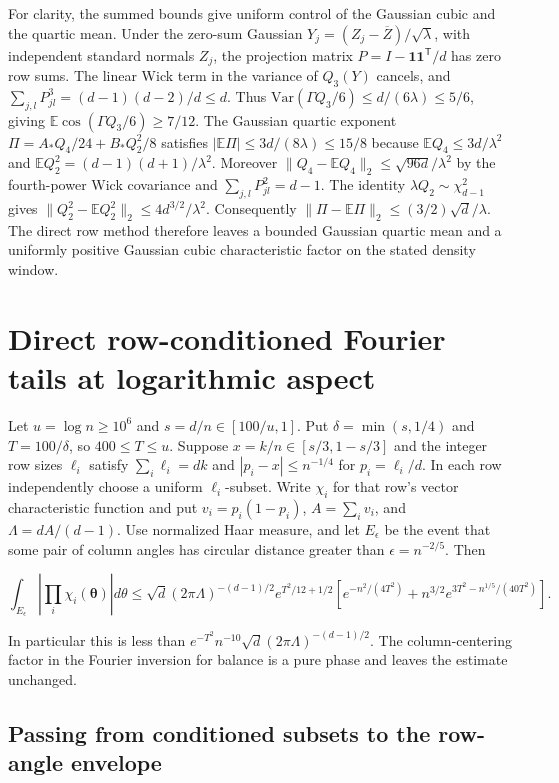 \documentclass[11pt]{article}
\begin{document}
For clarity, the summed bounds give uniform control of the Gaussian
cubic and the quartic mean. Under the zero-sum Gaussian
$Y_j=(Z_j-\overline Z)/\sqrt\lambda$, with independent standard
normals $Z_j$, the projection matrix
$P=I-\mathbf1\mathbf1^{\mathsf T}/d$ has zero row sums. The linear Wick
term in the variance of $Q_3(Y)$ cancels, and
$\sum_{j,l}P_{jl}^3=(d-1)(d-2)/d\le d$. Thus
$\mathrm{Var}(\Gamma Q_3/6)\le d/(6\lambda)\le5/6$, giving
$\mathbb E\cos(\Gamma Q_3/6)\ge7/12$.
The Gaussian quartic exponent
$\Pi=A_{\ast}Q_4/24+B_{\ast}Q_2^2/8$ satisfies
$|\mathbb E\Pi|\le3d/(8\lambda)\le15/8$ because
$\mathbb E Q_4\le3d/\lambda^2$ and
$\mathbb E Q_2^2=(d-1)(d+1)/\lambda^2$.
Moreover
$\|Q_4-\mathbb E Q_4\|_2\le\sqrt{96d}/\lambda^2$ by the fourth-power
Wick covariance and $\sum_{j,l}P_{jl}^2=d-1$.
The identity $\lambda Q_2\sim\chi^2_{d-1}$ gives
$\|Q_2^2-\mathbb E Q_2^2\|_2\le4d^{3/2}/\lambda^2$.
Consequently $\|\Pi-\mathbb E\Pi\|_2\le (3/2)\sqrt d/\lambda$.
The direct row method therefore leaves a bounded Gaussian quartic
mean and a uniformly positive Gaussian cubic characteristic factor
on the stated density window.

\section{Direct row-conditioned Fourier tails at logarithmic aspect}

Let $u=\log n\ge10^6$ and $s=d/n\in[100/u,1]$. Put $\delta=\min(s,1/4)$ and $T=100/\delta$, so $400\le T\le u$.
Suppose $x=k/n\in[s/3,1-s/3]$ and the integer row sizes $\ell_i$
satisfy $\sum_i\ell_i=dk$ and $|p_i-x|\le n^{-1/4}$ for $p_i=\ell_i/d$.
In each row independently choose a uniform $\ell_i$-subset. Write
$\chi_i$ for that row's vector characteristic function and put
$v_i=p_i(1-p_i)$, $A=\sum_i v_i$, and $\Lambda=dA/(d-1)$.
Use normalized Haar measure, and let $E_\epsilon$ be the event that
some pair of column angles has circular distance greater than
$\epsilon=n^{-2/5}$. Then

\[
\int_{E_\epsilon}\left|\prod_i\chi_i(\boldsymbol\theta)\right|d\theta
\le \sqrt d(2\pi\Lambda)^{-(d-1)/2} e^{T^2/12+1/2}
\left[
e^{-n^2/(4T^2)}
+n^{3/2}e^{3T^2-n^{1/5}/(40T^2)}
\right].
\]

In particular this is less than
$e^{-T^2}n^{-10}\sqrt d(2\pi\Lambda)^{-(d-1)/2}$.
The column-centering factor in the Fourier inversion for balance
is a pure phase and leaves the estimate unchanged.

\subsection{Passing from conditioned subsets to the row-angle envelope}
\end{document}
